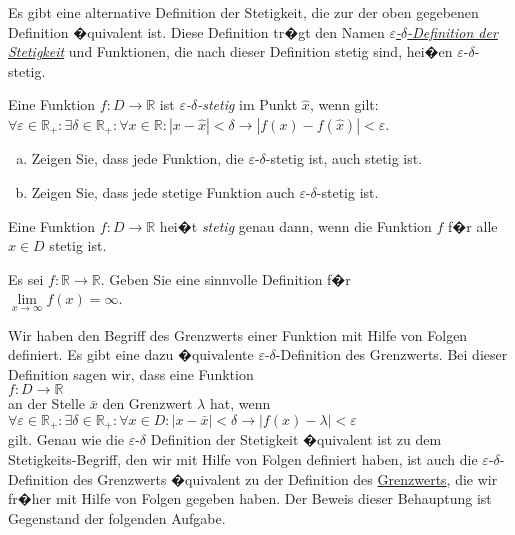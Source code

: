 \noindent
Es gibt eine alternative Definition der Stetigkeit, die zur der oben gegebenen Definition
�quivalent ist. Diese Definition tr�gt den Namen 
\href{http://de.wikipedia.org/wiki/Epsilon-Delta-Kriterium#Stetigkeit_reeller_Funktionen}{\emph{$\varepsilon$-$\delta$-Definition der Stetigkeit}} 
und Funktionen, die nach dieser Definition stetig sind, hei�en $\varepsilon$-$\delta$-stetig.

\begin{Definition} 
  Eine Funktion $f:D \rightarrow \mathbb{R}$ ist \emph{$\varepsilon$-$\delta$-stetig} im Punkt
  $\widehat{x}$, wenn gilt: 
  \\[0.2cm]
  \hspace*{1.3cm}
  $\forall \varepsilon \in \mathbb{R}_+: \exists \delta \in \mathbb{R}_+: \forall x \in \mathbb{R}: 
   |x - \widehat{x}| < \delta \rightarrow |f(x) - f(\widehat{x})| < \varepsilon$.
  \eod
\end{Definition}


\exercise
\begin{enumerate}[(a)]
\item Zeigen Sie, dass jede Funktion, die $\varepsilon$-$\delta$-stetig ist,
      auch stetig ist.
\item Zeigen Sie, dass jede stetige Funktion auch $\varepsilon$-$\delta$-stetig ist.
      \eox
\end{enumerate}


\begin{Definition} \lb
Eine Funktion $f:D \rightarrow \mathbb{R}$ hei�t \emph{stetig} genau dann, wenn
die Funktion $f$ f�r alle $\widehat{x} \in D$ stetig ist.
\eod
\end{Definition}

\exercise
Es sei $f: \mathbb{R} \rightarrow \mathbb{R}$.  Geben Sie eine sinnvolle Definition f�r 
\\[0.2cm]
\hspace*{1.3cm}
$\lim\limits_{x\rightarrow\infty} f(x) = \infty$.
\eox

\remark
Wir haben den Begriff des Grenzwerts einer Funktion mit Hilfe von Folgen definiert.  Es gibt eine
dazu �quivalente $\varepsilon$-$\delta$-Definition des Grenzwerts.  Bei dieser Definition sagen wir,
dass eine Funktion
\\[0.2cm]
\hspace*{1.3cm}
$f: D \rightarrow \mathbb{R}$
\\[0.2cm]
an der Stelle $\bar{x}$ den Grenzwert $\lambda$ hat, wenn
\\[0.2cm]
\hspace*{1.3cm}
$\forall \varepsilon\in\mathbb{R}_+: \exists\delta\in\mathbb{R}_+: \forall x\in D: |x-\bar{x}|<\delta \rightarrow |f(x) - \lambda| < \varepsilon$
\\[0.2cm]
gilt.  Genau wie die $\varepsilon$-$\delta$ Definition der Stetigkeit �quivalent ist zu dem
Stetigkeits-Begriff, den wir mit Hilfe von Folgen definiert haben, ist auch die
$\varepsilon$-$\delta$-Definition des Grenzwerts �quivalent zu der Definition des
\href{http://de.wikipedia.org/wiki/Grenzwert_(Funktion)}{Grenzwerts}, die wir 
fr�her mit Hilfe von Folgen gegeben haben.  Der Beweis dieser Behauptung ist Gegenstand der 
folgenden Aufgabe.

